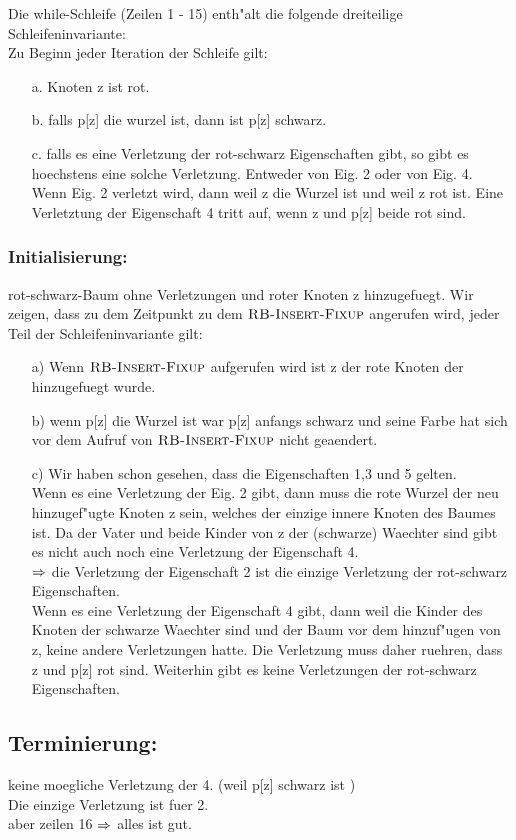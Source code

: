 \documentclass[a4paper,twoside,DIV15,BCOR12mm]{scrbook}
\begin{document}
Die while-Schleife (Zeilen 1 - 15) enth"alt die folgende dreiteilige Schleifeninvariante:\\
Zu Beginn jeder Iteration der Schleife gilt:
\begin{itemize}
\item[a.] Knoten z ist rot.
\item[b.] falls p[z] die wurzel ist, dann ist p[z] schwarz.
\item[c.] falls es eine Verletzung der rot-schwarz Eigenschaften gibt, so gibt es hoechstens eine solche Verletzung. Entweder von Eig. 2 oder von Eig. 4. Wenn Eig. 2 verletzt wird, dann weil z die Wurzel ist und weil z rot ist. Eine Verletztung der Eigenschaft 4 tritt auf, wenn z und p[z] beide rot sind. 
\end{itemize}


\subsubsection*{Initialisierung: }
rot-schwarz-Baum ohne Verletzungen und roter Knoten z hinzugefuegt. 
Wir zeigen, dass zu dem Zeitpunkt zu dem $\textnormal{\scshape RB-Insert-Fixup}$ angerufen wird, jeder Teil der Schleifeninvariante gilt:
\begin{itemize}
\item[a)] Wenn $\textnormal{\scshape RB-Insert-Fixup}$ aufgerufen wird ist z der rote Knoten der hinzugefuegt wurde.
\item[b)] wenn p[z] die Wurzel ist war p[z] anfangs schwarz und seine Farbe hat sich vor dem Aufruf von $\textnormal{\scshape RB-Insert-Fixup}$ nicht geaendert.
\item[c)] Wir haben schon gesehen, dass die Eigenschaften 1,3 und 5 gelten.\\
	Wenn es eine Verletzung der Eig. 2 gibt, dann muss die rote Wurzel der neu hinzugef"ugte Knoten z sein, welches der einzige innere Knoten des Baumes ist. Da der Vater und beide Kinder von z der (schwarze) Waechter sind gibt es nicht auch noch eine Verletzung der Eigenschaft 4. \\ $\Rightarrow$ die Verletzung der Eigenschaft 2 ist die einzige Verletzung der rot-schwarz Eigenschaften. \\
Wenn es eine Verletzung der Eigenschaft 4 gibt, dann weil  die Kinder des Knoten der schwarze Waechter sind und der Baum vor dem hinzuf"ugen von z, keine andere Verletzungen hatte. Die Verletzung muss daher ruehren, dass z und p[z] rot sind. Weiterhin gibt es keine Verletzungen der rot-schwarz Eigenschaften.
\end{itemize}
\subsection*{Terminierung: }
keine moegliche Verletzung der 4. (weil p[z] schwarz ist )\\
Die einzige Verletzung ist fuer 2.\\
aber zeilen 16 $\Rightarrow$ alles ist gut.\\
\end{document}
